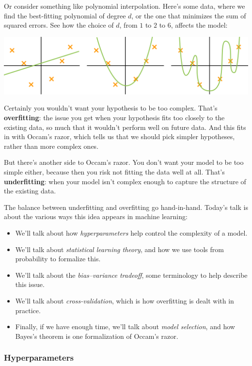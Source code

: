 \documentclass[11pt,paper=letter]{scrartcl}
\begin{document}
Or consider something like polynomial interpolation. Here's some data, where we find the best-fitting polynomial of degree $d$, or the one that minimizes the sum of squared errors. See how the choice of $d$, from $1$ to $2$ to $6$, affects the model:

\begin{center}
  \includegraphics[width=\textwidth]{17.png}
\end{center}

Certainly you wouldn't want your hypothesis to be too complex. That's \textbf{overfitting}: the issue you get when your hypothesis fits too closely to the existing data, so much that it wouldn't perform well on future data. And this fits in with Occam's razor, which tells us that we should pick simpler hypotheses, rather than more complex ones.

But there's another side to Occam's razor. You don't want your model to be too simple either, because then you risk not fitting the data well at all. That's \textbf{underfitting}: when your model isn't complex enough to capture the structure of the existing data.

The balance between underfitting and overfitting go hand-in-hand. Today's talk is about the various ways this idea appears in machine learning:
\begin{itemize}
  \item We'll talk about how \textit{hyperparameters} help control the complexity of a model.
  \item We'll talk about \textit{statistical learning theory}, and how we use tools from probability to formalize this.
  \item We'll talk about the \textit{bias--variance tradeoff}, some terminology to help describe this issue.
  \item We'll talk about \textit{cross-validation}, which is how overfitting is dealt with in practice.
  \item Finally, if we have enough time, we'll talk about \textit{model selection}, and how Bayes's theorem is one formalization of Occam's razor.
\end{itemize}

\subsubsection*{Hyperparameters}
\end{document}
